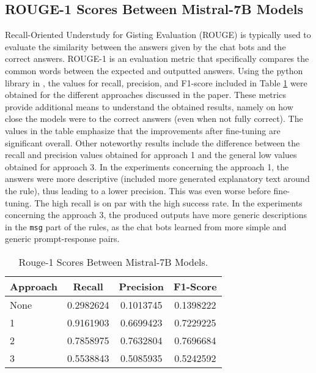 \documentclass[sigconf]{acmart}
\begin{document}
\subsection{ROUGE-1 Scores Between Mistral-7B Models}
Recall-Oriented Understudy for Gisting Evaluation (ROUGE) \cite{Lin04} is typically used to evaluate the similarity between the answers given by the chat bots and the correct answers. ROUGE-1 is an evaluation metric that specifically compares the common words between the expected and outputted answers. Using the python library in \cite{Tardy21}, the values for recall, precision, and F1-score included in Table \ref{tab:rouge} were obtained for the different approaches discussed in the paper. These metrics provide additional means to understand the obtained results, namely on how close the models were to the correct answers (even when not fully correct). The values in the table emphasize that the improvements after fine-tuning are significant overall. Other noteworthy results include the difference between the recall and precision values obtained for approach 1 and the general low values obtained for approach 3. In the experiments concerning the approach 1, the answers were more descriptive (included more generated explanatory text around the rule), thus leading to a lower precision. This was even worse before fine-tuning. The high recall is on par with the high success rate. In the experiments concerning the approach 3, the produced outputs have more generic descriptions in the \texttt{msg} part of the rules, as the chat bots learned from more simple and generic prompt-response pairs.

\begin{table}[h]
  \caption{Rouge-1 Scores Between Mistral-7B Models.}
  \label{tab:rouge}
  \begin{tabular}{@{}lccc@{}}
    \toprule
    \textbf{Approach} & \textbf{Recall} & \textbf{Precision} & \textbf{F1-Score} \\
    \midrule
    None & 0.2982624 & 0.1013745 & 0.1398222 \\
    1    & 0.9161903 & 0.6699423 & 0.7229225 \\
    2    & 0.7858975 & 0.7632804 & 0.7696684 \\
    3    & 0.5538843 & 0.5085935 & 0.5242592 \\
    \bottomrule
  \end{tabular}
\end{table}
\end{document}
